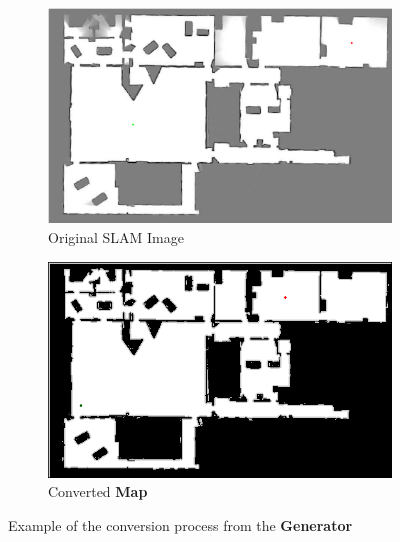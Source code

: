 \begin{figure}[h]
  \centering
  \begin{subfigure}[b]{0.3\linewidth}
    \includegraphics[width=\linewidth]{images/map10.png}
     \caption{Original SLAM Image}
  \end{subfigure}
  \hspace{1.5cm}
  \begin{subfigure}[b]{0.3\linewidth}
    \includegraphics[width=\linewidth]{images/screenshot_108.png}
     \caption{Converted \textbf{Map}}
  \end{subfigure}
  \caption{Example of the conversion process from the \textbf{Generator}}
  \label{fig: converted map}
\end{figure}


